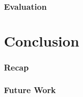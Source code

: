 \documentclass[11pt,a4paper,notitlepage]{article}
\begin{document}
\section{Evaluation}



\part{Conclusion}

\section{Recap}

\section{Future Work}




 
\end{document}
